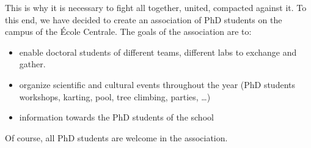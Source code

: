 \documentclass[11pt]{report}
\begin{document}
This is why it is necessary to fight all together, united, compacted against it.
To this end, we have decided to create an association of PhD students on the campus of the École Centrale.
The goals of the association are to:
\begin{itemize}
\item enable doctoral students of different teams, different labs to exchange and gather.
\item organize scientific and cultural events throughout the year (PhD students workshops, karting, pool, tree climbing, parties, \dots)
\item information towards the PhD students of the school
\end{itemize}
Of course, all PhD students are welcome in the association.






\end{document}
